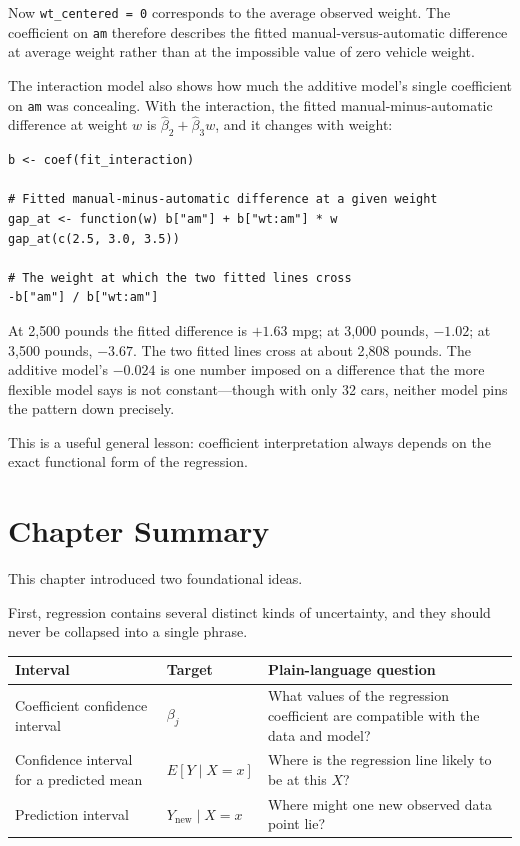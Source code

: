 \documentclass[11pt]{report}
\begin{document}
Now \texttt{wt\_centered = 0} corresponds to the average observed weight. The coefficient on \texttt{am} therefore describes the fitted manual-versus-automatic difference at average weight rather than at the impossible value of zero vehicle weight.

The interaction model also shows how much the additive model's single coefficient on \texttt{am} was concealing. With the interaction, the fitted manual-minus-automatic difference at weight \(w\) is \(\widehat{\beta}_2+\widehat{\beta}_3w\), and it changes with weight:

\begin{lstlisting}
b <- coef(fit_interaction)

# Fitted manual-minus-automatic difference at a given weight
gap_at <- function(w) b["am"] + b["wt:am"] * w
gap_at(c(2.5, 3.0, 3.5))

# The weight at which the two fitted lines cross
-b["am"] / b["wt:am"]
\end{lstlisting}

At 2{,}500 pounds the fitted difference is \(+1.63\) mpg; at 3{,}000 pounds, \(-1.02\); at 3{,}500 pounds, \(-3.67\). The two fitted lines cross at about 2{,}808 pounds. The additive model's \(-0.024\) is one number imposed on a difference that the more flexible model says is not constant---though with only 32 cars, neither model pins the pattern down precisely.

This is a useful general lesson: coefficient interpretation always depends on the exact functional form of the regression.

\section{Chapter Summary}

This chapter introduced two foundational ideas.

First, regression contains several distinct kinds of uncertainty, and they should never be collapsed into a single phrase.

\begin{center}
\begin{tabular}{p{} p{} p{}}
\toprule
\textbf{Interval} & \textbf{Target} & \textbf{Plain-language question}\\
\midrule
Coefficient confidence interval
&
\(\beta_j\)
&
What values of the regression coefficient are compatible with the data and model?
\\[0.8em]

Confidence interval for a predicted mean
&
\(E[Y\mid X=x]\)
&
Where is the regression line likely to be at this \(X\)?
\\[0.8em]

Prediction interval
&
\(Y_{\text{new}}\mid X=x\)
&
Where might one new observed data point lie?
\\
\bottomrule
\end{tabular}
\end{center}
\end{document}
